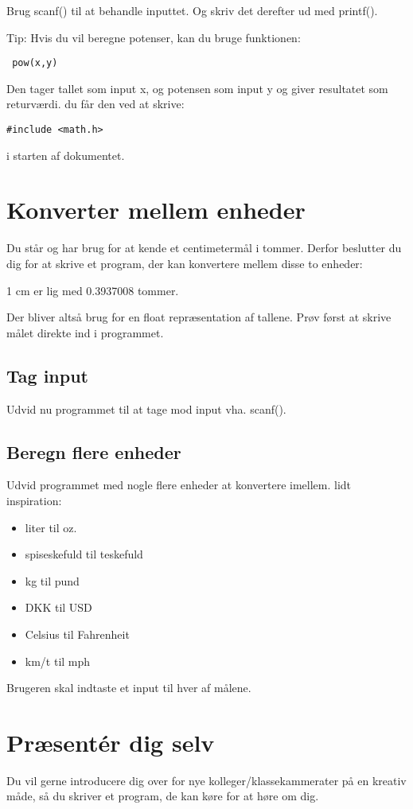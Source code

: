 \documentclass[hidelinks]{article} %
\begin{document}
Brug scanf() til at behandle inputtet. Og skriv det derefter ud med printf().

Tip: Hvis du vil beregne potenser, kan du bruge funktionen:
\begin{verbatim} pow(x,y) 
\end{verbatim}
Den tager tallet som input x, og potensen som input y og giver resultatet som returværdi.
du får den ved at skrive:
\begin{verbatim}
#include <math.h>
\end{verbatim}
i starten af dokumentet.

	\section{Konverter mellem enheder}
Du står og har brug for at kende et centimetermål i tommer. Derfor beslutter du dig for at skrive et program, der kan konvertere mellem disse to enheder:

1 cm er lig med 0.3937008 tommer.

Der bliver altså brug for en float repræsentation af tallene.
Prøv først at skrive målet direkte ind i programmet.

	\subsection{Tag input}
Udvid nu programmet til at tage mod input vha. scanf().

	\subsection{Beregn flere enheder}
Udvid programmet med nogle flere enheder at konvertere imellem. lidt inspiration:

\begin{itemize}
	\item{liter til oz.}
	\item{spiseskefuld til teskefuld}
	\item{kg til pund}
	\item{DKK til USD}
	\item{Celsius til Fahrenheit}
	\item{km/t til mph}
\end{itemize}

Brugeren skal indtaste et input til hver af målene.

	\section{Præsentér dig selv}
Du vil gerne introducere dig over for nye kolleger/klassekammerater på en kreativ måde, så du skriver et program, de kan køre for at høre om dig.
\end{document}
